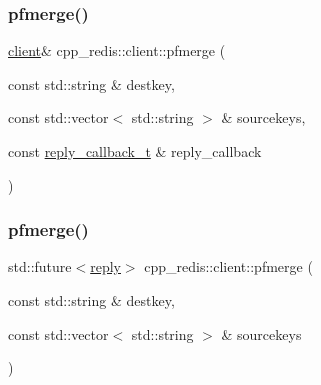\mbox{\label{classcpp__redis_1_1client_aad4f7f35b13e4d236d178ed47a499353}} 
\subsubsection{\texorpdfstring{pfmerge()}{pfmerge()}\hspace{0.1cm}{\footnotesize\ttfamily [1/2]}}
{\footnotesize\ttfamily \hyperlink{classcpp__redis_1_1client}{client}\& cpp\+\_\+redis\+::client\+::pfmerge (\begin{DoxyParamCaption}\item[{const std\+::string \&}]{destkey,  }\item[{const std\+::vector$<$ std\+::string $>$ \&}]{sourcekeys,  }\item[{const \hyperlink{classcpp__redis_1_1client_a061a1140d36d2eaeda82b09a0bb3f9f2}{reply\+\_\+callback\+\_\+t} \&}]{reply\+\_\+callback }\end{DoxyParamCaption})}

\mbox{\label{classcpp__redis_1_1client_acfeb0b2a7adb65d9cb940d96b9d24478}} 
\subsubsection{\texorpdfstring{pfmerge()}{pfmerge()}\hspace{0.1cm}{\footnotesize\ttfamily [2/2]}}
{\footnotesize\ttfamily std\+::future$<$\hyperlink{classcpp__redis_1_1reply}{reply}$>$ cpp\+\_\+redis\+::client\+::pfmerge (\begin{DoxyParamCaption}\item[{const std\+::string \&}]{destkey,  }\item[{const std\+::vector$<$ std\+::string $>$ \&}]{sourcekeys }\end{DoxyParamCaption})}

\mbox{\label{classcpp__redis_1_1client_a19f0127614ca1369dcf739427079f7ec}} 
